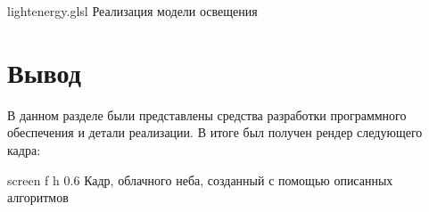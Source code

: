 {lightenergy.glsl} %
{} %
{Реализация модели освещения} %





\section{Вывод}

В данном разделе были представлены средства разработки программного обеспечения и детали реализации. В итоге был получен рендер следующего кадра:

{screen} %
{f} %
{h} %
{0.6\textwidth} %
{Кадр, облачного неба, созданный с помощью описанных алгоритмов} %

